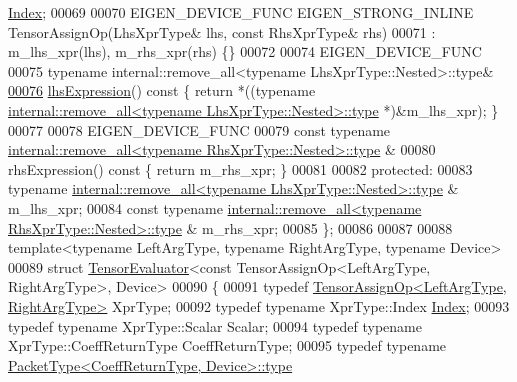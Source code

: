 \begin{DoxyCode}
       \hyperlink{namespace_eigen_a62e77e0933482dafde8fe197d9a2cfde}{Index};
00069 
00070   EIGEN\_DEVICE\_FUNC EIGEN\_STRONG\_INLINE TensorAssignOp(LhsXprType& lhs, \textcolor{keyword}{const} RhsXprType& rhs)
00071       : m\_lhs\_xpr(lhs), m\_rhs\_xpr(rhs) \{\}
00072 
00074     EIGEN\_DEVICE\_FUNC
00075     \textcolor{keyword}{typename} internal::remove\_all<typename LhsXprType::Nested>::type&
\hyperlink{class_eigen_1_1_tensor_assign_op_a1a6f7336727e3f95616014883d514caa}{00076}     \hyperlink{class_eigen_1_1_tensor_assign_op_a1a6f7336727e3f95616014883d514caa}{lhsExpression}()\textcolor{keyword}{ const }\{ \textcolor{keywordflow}{return} *((\textcolor{keyword}{typename} 
      \hyperlink{group___sparse_core___module}{internal::remove\_all<typename LhsXprType::Nested>::type}
      *)&m\_lhs\_xpr); \}
00077 
00078     EIGEN\_DEVICE\_FUNC
00079     \textcolor{keyword}{const} \textcolor{keyword}{typename} \hyperlink{group___sparse_core___module}{internal::remove\_all<typename RhsXprType::Nested>::type}
      &
00080     rhsExpression()\textcolor{keyword}{ const }\{ \textcolor{keywordflow}{return} m\_rhs\_xpr; \}
00081 
00082   \textcolor{keyword}{protected}:
00083     \textcolor{keyword}{typename} \hyperlink{group___sparse_core___module}{internal::remove\_all<typename LhsXprType::Nested>::type}
      & m\_lhs\_xpr;
00084     \textcolor{keyword}{const} \textcolor{keyword}{typename} \hyperlink{group___sparse_core___module}{internal::remove\_all<typename RhsXprType::Nested>::type}
      & m\_rhs\_xpr;
00085 \};
00086 
00087 
00088 \textcolor{keyword}{template}<\textcolor{keyword}{typename} LeftArgType, \textcolor{keyword}{typename} RightArgType, \textcolor{keyword}{typename} Device>
00089 \textcolor{keyword}{struct }\hyperlink{struct_eigen_1_1_tensor_evaluator}{TensorEvaluator}<const TensorAssignOp<LeftArgType, RightArgType>, Device>
00090 \{
00091   \textcolor{keyword}{typedef} \hyperlink{class_eigen_1_1_tensor_assign_op}{TensorAssignOp<LeftArgType, RightArgType>} XprType;
00092   \textcolor{keyword}{typedef} \textcolor{keyword}{typename} XprType::Index \hyperlink{namespace_eigen_a62e77e0933482dafde8fe197d9a2cfde}{Index};
00093   \textcolor{keyword}{typedef} \textcolor{keyword}{typename} XprType::Scalar Scalar;
00094   \textcolor{keyword}{typedef} \textcolor{keyword}{typename} XprType::CoeffReturnType CoeffReturnType;
00095   \textcolor{keyword}{typedef} \textcolor{keyword}{typename} \hyperlink{group___sparse_core___module}{PacketType<CoeffReturnType, Device>::type} 

\end{DoxyCode}
